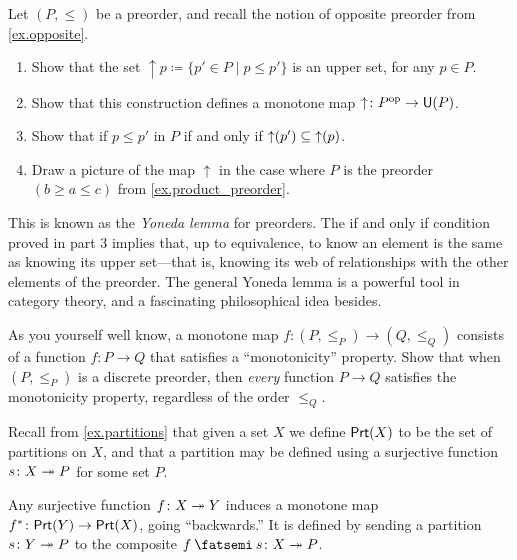 \documentclass[7Sketches]{subfiles}
\begin{document}
\begin{exercise}%
\label{exc.upper_set}
  Let $(P,\leq)$ be a preorder, and recall the notion of opposite preorder from \cref{ex.opposite}.
\begin{enumerate}
	\item Show that the set $\uparrow p\coloneqq\{p'\in P\mid p\leq p'\}$ is an upper set, for any $p\in P$.
	\item Show that this construction defines a monotone map $\uparrow\colon P^{\textnormal{op}}\to\mathsf{U}(P)$.
	\item Show that if $p \le p'$ in $P$ if and only if $\mathop{\uparrow}(p')
	\subseteq \mathop{\uparrow}(p)$. 
	\item Draw a picture of the map $\uparrow$ in the case where $P$ is the preorder $(b\geq a\leq c)$ from \cref{ex.product_preorder}.
\end{enumerate}
This is known as the \emph{Yoneda lemma} for preorders.%
 The if and only if
condition proved in part 3 implies that, up to equivalence, to know an element
is the same as knowing its upper set---that is, knowing its web of
relationships with the other elements of the preorder. The general Yoneda lemma
is a powerful tool in category theory, and a fascinating philosophical idea
besides.
\end{exercise}

\begin{exercise}%
\label{exc.monotone_from_discrete}
As you yourself well know, a monotone map $f\colon\mbox{$(P,\leq_P)$}\to\mbox{$(Q,\leq_Q)$}$ consists of a function $f\colon P\to Q$ that satisfies a ``monotonicity'' property. Show that when $(P,\leq_P)$ is a discrete preorder, then \emph{every} function $P\to Q$ satisfies the monotonicity property, regardless of the order $\leq_Q$.%
\end{exercise}

\begin{example}%
\label{ex.ptnmonotone}%
Recall from \cref{ex.partitions} that given a set $X$ we define $\mathsf{Prt}(X)$ to be
the set of partitions on $X$, and that a partition may be defined using a
surjective function $s\colon X \twoheadrightarrow P$ for some set $P$.

Any surjective function $f\colon X \twoheadrightarrow Y$ induces a monotone map
$f^\ast\colon \mathsf{Prt}(Y) \to \mathsf{Prt}(X)$, going ``backwards.'' It is defined by sending
a partition $s\colon Y \twoheadrightarrow P$ to the composite $f\cp s\colon X \surj P$.%
\end{example}
\end{document}
